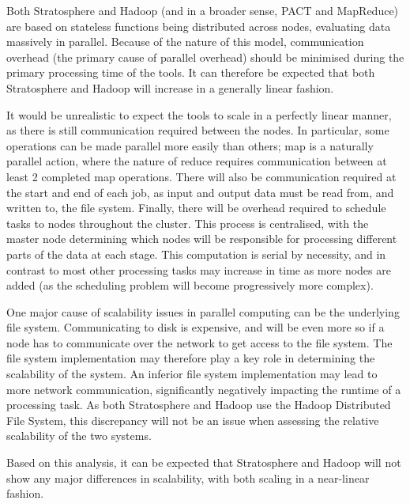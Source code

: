 Both Stratosphere and Hadoop (and in a broader sense, PACT and MapReduce) are based on stateless functions being distributed across nodes, evaluating data massively in parallel. Because of the nature of this model, communication overhead (the primary cause of parallel overhead) should be minimised during the primary processing time of the tools. It can therefore be expected that both Stratosphere and Hadoop will increase in a generally linear fashion.

It would be unrealistic to expect the tools to scale in a perfectly linear manner, as there is still communication required between the nodes. In particular, some operations can be made parallel more easily than others; map is a naturally parallel action, where the nature of reduce requires communication between at least 2 completed map operations. There will also be communication required at the start and end of each job, as input and output data must be read from, and written to, the file system. Finally, there will be overhead required to schedule tasks to nodes throughout the cluster. This process is centralised, with the master node determining which nodes will be responsible for processing different parts of the data at each stage. This computation is serial by necessity, and in contrast to most other processing tasks may increase in time as more nodes are added (as the scheduling problem will become progressively more complex). 

One major cause of scalability issues in parallel computing can be the underlying file system. Communicating to disk is expensive, and will be even more so if a node has to communicate over the network to get access to the file system. The file system implementation may therefore play a key role in determining the scalability of the system. An inferior file system implementation may lead to more network communication, significantly negatively impacting the runtime of a processing task. As both Stratosphere and Hadoop use the Hadoop Distributed File System, this discrepancy will not be an issue when assessing the relative scalability of the two systems.

Based on this analysis, it can be expected that Stratosphere and Hadoop will not show any major differences in scalability, with both scaling in a near-linear fashion.